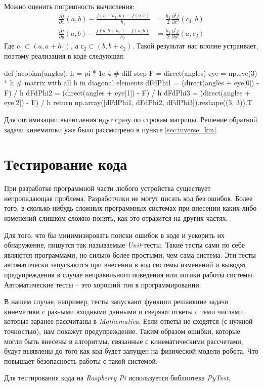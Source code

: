 \noindent Можно оценить погрешность вычисления:
\begin{align*}
    \frac{\partial f}{\partial x}(a, b) - \frac{f(a+h_1, b) - f(a, b)}{h_1} &= \frac{h_1}{2} \frac{\partial^2 f}{\partial x^2}(c_1, b) \\ 
    \frac{\partial f}{\partial y}(a, b) - \frac{f(a, b+h_2) - f(a, b)}{h_2} &= \frac{h_2}{2} \frac{\partial^2 f}{\partial y^2}(a, c_2)
\end{align*}
\noindent Где $ c_1 \subset (a, a+h_1) $, а $ с_2 \subset (b, b+c_2) $. Такой результат нас вполне устраивает, поэтому реализация в коде следующая:
\begin{python}
def jacobian(angles):
    h = pi * 1e-4 # diff step
    F = direct(angles)
    eye = np.eye(3) * h # matrix with all h in diagonal elements
    dFdPhi1 = (direct(angles + eye[0]) - F) / h
    dFdPhi2 = (direct(angles + eye[1]) - F) / h
    dFdPhi3 = (direct(angles + eye[2]) - F) / h
    return np.array([dFdPhi1, dFdPhi2, dFdPhi3]).reshape((3, 3)).T
\end{python}

\noindent Для оптимизации вычисления идут сразу по строкам матрицы.
Решение обратной задачи кинематики уже было рассмотрено в пункте \ref{sec:inverse_kin}.

\section{Тестирование кода}

При разработке программной части любого устройства существует непропадающая проблема. Разработчики не могут писать код без ошибок.
Более того, в сколько-нибудь сложных программных системах при внесении каких-либо изменений слишком сложно понять, как это отразится на других частях.

Для того, что бы минимизировать поиски ошибок в коде и ускорить их обнаружение, пишутся так называемые \textit{Unit}-тесты. Такие тесты сами по себе являются программами, но сильно более простыми, чем сама система. Эти тесты автоматически запускаются при внесении в код системы изменений и выводят предупреждения в случае неправильного поведения или логики работы системы.
Автоматические тесты -- это хороший тон в программировании.

В нашем случае, например, тесты запускают функции решающие задачи кинематики с разными входными данными и сверяют ответы с теми числами, которые заранее рассчитаны в \textit{Mathematica}. Если ответы не сходятся (с нужной точностью), нам покажут предупреждение. Таким образом ошибки, которые могли быть внесены в алгоритмы, связанные с кинематическими рассчетами, будут выявлены до того как код будет запущен на физической модели робота. Что повышает безопасность работы с такой системой.

Для тестирования кода на \textit{Raspberry Pi} используется библиотека \textit{PyTest}.

